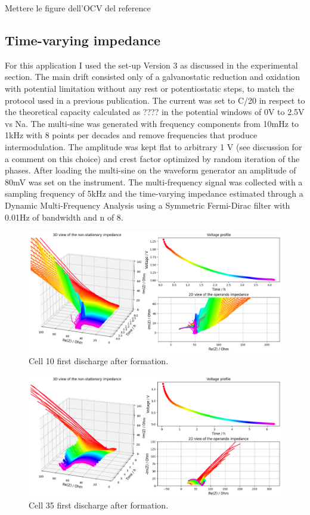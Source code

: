 \colorbox{BurntOrange}{Mettere le figure dell’OCV del reference}

\subsection{Time-varying impedance}

For this application I used the set-up Version 3 as discussed in the experimental section. The main drift consisted only of a galvanostatic reduction and oxidation with potential limitation without any rest or potentiostatic steps, to match the protocol used in a previous publication. The current was set to C/20 in respect to the theoretical capacity calculated as ????  in the potential windows of 0V to 2.5V vs Na. The multi-sine was generated with frequency components from 10mHz to 1kHz with 8 points per decades and remove frequencies that produce intermodulation. The amplitude was kept flat to arbitrary 1 V (see discussion for a comment on this choice) and crest factor optimized by random iteration of the phases. After loading the multi-sine on the waveform generator an amplitude of 80mV was set on the instrument. The multi-frequency signal was collected with a sampling frequency of 5kHz and the time-varying impedance estimated  through a Dynamic Multi-Frequency Analysis using a Symmetric Fermi-Dirac filter with 0.01Hz of bandwidth and n of 8.

\begin{figure}[h]
    \centering
    \includegraphics[width=\linewidth]{figures/application3/image6.png}
    \caption{Cell 10 first discharge after formation.}
    \label{fig:cell10_firs_cycle}
\end{figure}

\begin{figure}[h]
    \centering
    \includegraphics[width=\linewidth]{figures/application3/image7.png}
    \caption{Cell 35 first discharge after formation.}
    \label{fig:cell35_firs_cycle}
\end{figure}

